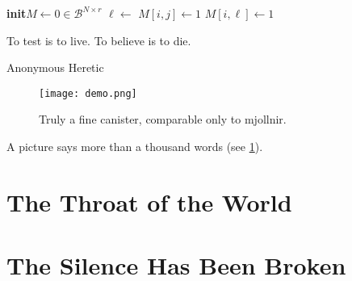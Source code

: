 \documentclass[a4paper, 11pt]{memoir}
\begin{document}
\begin{algorithm}
	\small
	\begin{shaded}
		\begin{algorithmic}[1]
			\newcommand*{\To}{\textbf{to}\xspace}
			\newcommand*{\Init}{\State\textbf{init}\xspace}
			\newcommand*{\B}{\mathcal{B}}
			\Init \(M \gets 0 \in \B^{N \times r}\) 
			\For{ \(i \gets 1\) \To N}
			\For{ \(j \gets r - r_1 + 1\) \To \(r\)}
			\State \(\ell \gets \)  
			\State \({M}[i, j] \gets 1\)
			\Else
			\State \({M}[i, \ell] \gets 1\)
			\EndIf
			\EndFor
			\EndFor
		\end{algorithmic}
	\end{shaded}
	\caption[Uncorrelated random data generation]{%
		Algorithm for the generation of a block $M$ of $N$ uncorrelated random
		vectors of length $r$, containing exactly $r_1$ ones.}
	\label{alg:binam_random_data}
\end{algorithm}

\epigraph{To test is to live. To believe is to die.}{Anonymous Heretic}
\blindtext

\begin{figure}
	\centering
	\texttt{[image: demo.png]}
	\caption{Truly a fine canister, comparable only to \gls{mjollnir}.}
	\label{fig:canister}
\end{figure}

\Blindtext\Blindtext

A picture says more than a thousand words (see \ref{fig:canister}).

\section{The Throat of the World}

\blindtext


\section{The Silence Has Been Broken}

\blindtext

\end{document}
